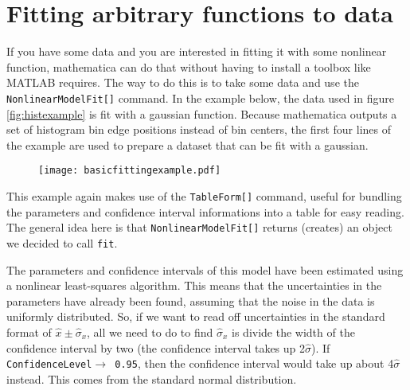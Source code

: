 \section{Fitting arbitrary functions to data}
If you have some data and you are interested in fitting it with some nonlinear function, mathematica can do that without having to install a toolbox like MATLAB requires. The way to do this is to take some data and use the \texttt{NonlinearModelFit[]} command. In the example below, the data used in figure \ref{fig:histexample} is fit with a gaussian function. Because mathematica outputs a set of histogram bin edge positions instead of bin centers, the first four lines of the example are used to prepare a dataset that can be fit with a gaussian.
\begin{figure}[H]
\centering \texttt{[image: basicfittingexample.pdf]}
\end{figure}
This example again makes use of the \texttt{TableForm[]} command, useful for bundling the parameters and confidence interval informations into a table for easy reading. The general idea here is that \texttt{NonlinearModelFit[]} returns (creates) an object we decided to call \texttt{fit}.

\begin{exercise}
The parameters and confidence intervals of this model have been estimated using a nonlinear least-squares algorithm. This means that the uncertainties in the parameters have already been found, assuming that the noise in the data is uniformly distributed. So, if we want to read off uncertainties in the standard format of $\hat x \pm \hat \sigma_x$, all we need to do to find $\hat \sigma_x$ is divide the width of the confidence interval by two (the confidence interval takes up 2$\hat\sigma$). If \texttt{ConfidenceLevel$\to$ 0.95}, then the confidence interval would take up about 4$\hat \sigma$ instead. This comes from the standard normal distribution.
\end{exercise}